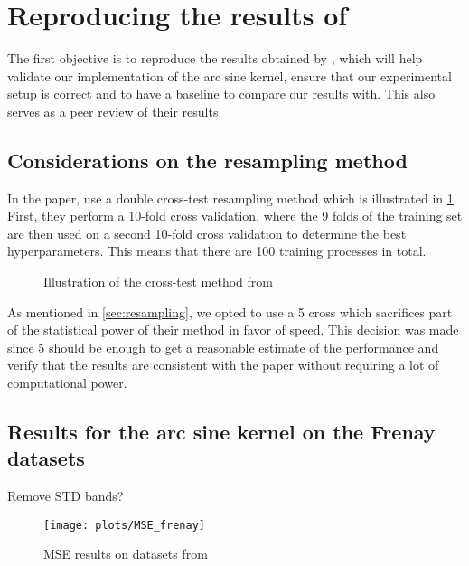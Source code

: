 \section{Reproducing the results of \texorpdfstring{\citeauthor{frenayParameterinsensitiveKernelExtreme2011}}{Frénay and Verleysen}}
\label{sec:reproducing-frenay}

The first objective is to reproduce the results obtained by
\textcite{frenayParameterinsensitiveKernelExtreme2011}, which will help validate
our implementation of the arc sine kernel, ensure that our experimental setup is
correct and to have a baseline to compare our results with. This also serves as
a peer review of their results.

\subsection{Considerations on the resampling method}

In the paper, \citeauthor{frenayParameterinsensitiveKernelExtreme2011} use a
double cross-test resampling method which is illustrated in
\cref{fig:frenay-cross-test}. First, they perform a 10-fold cross validation,
where the 9 folds of the training set are then used on a second 10-fold cross
validation to determine the best hyperparameters. This means that there are 100
training processes in total.

\begin{figure}[H]
    
    \caption{Illustration of the cross-test method from \cite{frenayParameterinsensitiveKernelExtreme2011}}
    \label{fig:frenay-cross-test}
\end{figure}

As mentioned in \cref{sec:resampling}, we opted to use a 5 cross
which sacrifices part of the statistical power of their method in favor of
speed. This decision was made since 5 should be enough to get a
reasonable estimate of the performance and verify that the results are
consistent with the paper without requiring a lot of computational power.

\subsection{Results for the arc sine kernel on the Frenay datasets}

\begin{important}
    Remove STD bands?
\end{important}
\begin{figure}[H]
    \texttt{[image: plots/MSE\_frenay]}
    \caption{MSE results on datasets from \cite{frenayParameterinsensitiveKernelExtreme2011}}
    \label{fig:mse-frenay}
\end{figure}

